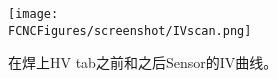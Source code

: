 \begin{figure}[H]
\centering
\texttt{[image: \\FCNCFigures/screenshot/IVscan.png]}
\caption{在焊上HV tab之前和之后Sensor的IV曲线。}
\label{fig:IVscan}
\end{figure}